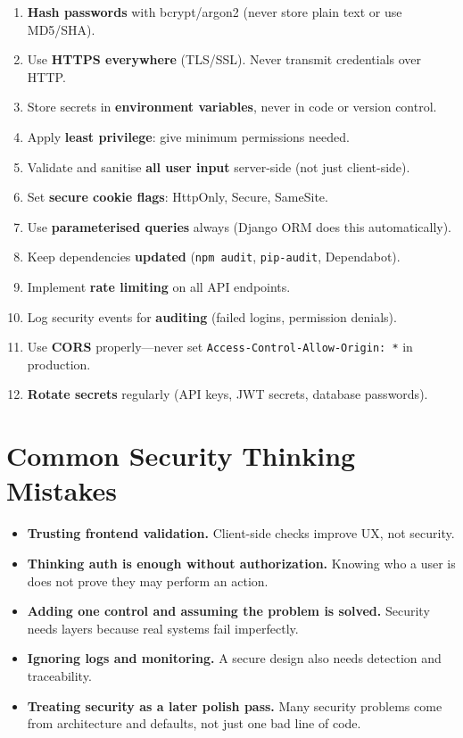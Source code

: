\documentclass[12pt, a4paper, oneside]{book}
\begin{document}
\begin{enumerate}[leftmargin=2em]
    \item \textbf{Hash passwords} with bcrypt/argon2 (never store plain text or use MD5/SHA).
    \item Use \textbf{HTTPS everywhere} (TLS/SSL). Never transmit credentials over HTTP.
    \item Store secrets in \textbf{environment variables}, never in code or version control.
    \item Apply \textbf{least privilege}: give minimum permissions needed.
    \item Validate and sanitise \textbf{all user input} server-side (not just client-side).
    \item Set \textbf{secure cookie flags}: HttpOnly, Secure, SameSite.
    \item Use \textbf{parameterised queries} always (Django ORM does this automatically).
    \item Keep dependencies \textbf{updated} (\texttt{npm audit}, \texttt{pip-audit}, Dependabot).
    \item Implement \textbf{rate limiting} on all API endpoints.
    \item Log security events for \textbf{auditing} (failed logins, permission denials).
    \item Use \textbf{CORS} properly---never set \texttt{Access-Control-Allow-Origin: *} in production.
    \item \textbf{Rotate secrets} regularly (API keys, JWT secrets, database passwords).
\end{enumerate}

\section{Common Security Thinking Mistakes}

\begin{itemize}[leftmargin=2em]
    \item \textbf{Trusting frontend validation.} Client-side checks improve UX, not security.
    \item \textbf{Thinking auth is enough without authorization.} Knowing who a user is does not prove they may perform an action.
    \item \textbf{Adding one control and assuming the problem is solved.} Security needs layers because real systems fail imperfectly.
    \item \textbf{Ignoring logs and monitoring.} A secure design also needs detection and traceability.
    \item \textbf{Treating security as a later polish pass.} Many security problems come from architecture and defaults, not just one bad line of code.
\end{itemize}
\end{document}
